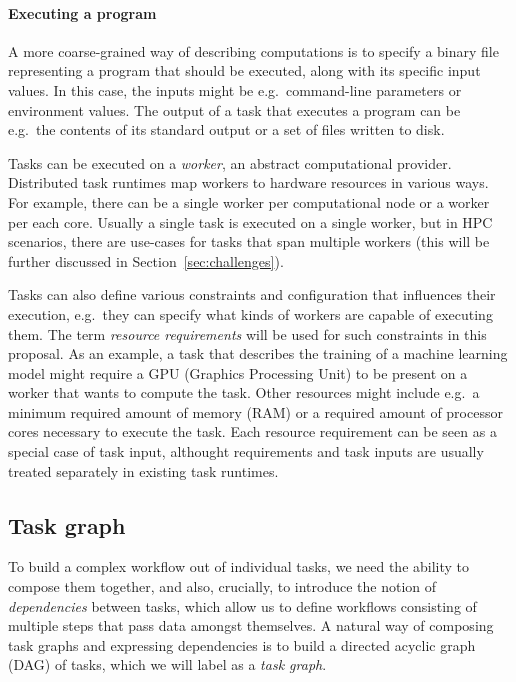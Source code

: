 \paragraph{Executing a program} A more coarse-grained way of describing computations is to specify
a binary file representing a program that should be executed, along with its specific input values.
In this case, the inputs might be e.g.\ command-line parameters or environment values. The
output of a task that executes a program can be e.g.\ the contents of its standard output or a set
of files written to disk.

\vspace{3mm}Tasks can be executed on a \emph{worker}, an abstract computational provider.
Distributed task runtimes map workers to hardware resources in various ways. For example, there
can be a single worker per computational node or a worker per each core.
Usually a single task is executed on a single worker, but in HPC scenarios, there are use-cases
for tasks that span multiple workers (this will be further discussed in Section~\ref{sec:challenges}).

Tasks can also define various constraints and configuration that influences their execution,
e.g.\ they can specify what kinds of workers are capable of executing them.
The term \emph{resource requirements} will be used for such constraints in this proposal. As an
example, a task that describes the training of a machine learning model might require a GPU
(Graphics Processing Unit) to be present on a worker that wants to compute the task. Other
resources might include e.g.\ a minimum required amount of memory (RAM) or a required amount of
processor cores necessary to execute the task. Each resource requirement can be seen as a
special case of task input, althought requirements and task inputs are usually treated
separately in existing task runtimes.

\subsection{Task graph}
To build a complex workflow out of individual tasks, we need the ability to compose them together,
and also, crucially, to introduce the notion of \emph{dependencies} between tasks, which allow us
to define workflows consisting of multiple steps that pass data amongst themselves.
A natural way of composing task graphs and expressing dependencies is to build a directed acyclic
graph (DAG) of tasks, which we will label as a \emph{task graph}.

